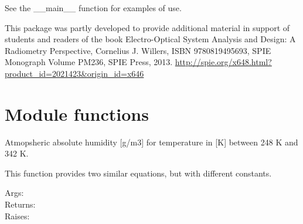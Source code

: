 \documentclass[a4paper,10pt,english]{sphinxmanual}
\begin{document}
See the \_\_main\_\_ function for examples of use.

This package was partly developed to provide additional material in support of students 
and readers of the book Electro-Optical System Analysis and Design: A Radiometry 
Perspective,  Cornelius J. Willers, ISBN 9780819495693, SPIE Monograph Volume
PM236, SPIE Press, 2013.  \href{http://spie.org/x648.html?product\_id=2021423\&origin\_id=x646}{http://spie.org/x648.html?product\_id=2021423\&origin\_id=x646}


\section{Module functions}
\label{ryutils:module-functions}

\begin{fulllineitems}
\label{ryutils:pyradi.ryutils.abshumidity}
Atmopsheric absolute humidity {[}g/m3{]} for temperature in {[}K{]} between 248 K and 342 K.

This function provides two similar equations, but with different constants.
\begin{description}
\item[{Args:}] \leavevmode
{}

\item[{Returns:}] \leavevmode
{}

\item[{Raises:}] \leavevmode
{}

\end{description}

\end{fulllineitems}
\end{document}

